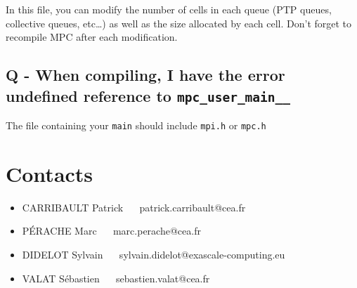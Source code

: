 \documentclass[a4paper,11pt]{article}
\begin{document}
In this file, you can modify the number of cells in each queue (PTP queues,
collective queues, etc\dots) as well as the size allocated by each cell. Don't
forget to recompile MPC after each modification.

\subsection*{Q - When compiling, I have the error undefined reference to \texttt{mpc\_user\_main\_\_}}
The file containing your \texttt{main} should include \texttt{mpi.h} or
\texttt{mpc.h}

\section{Contacts}
\begin{itemize}
  \item CARRIBAULT Patrick $\quad$ patrick.carribault@cea.fr
  \item P\'{E}RACHE Marc $\quad$ marc.perache@cea.fr
  \item DIDELOT Sylvain $\quad$ sylvain.didelot@exascale-computing.eu
  \item VALAT S\'{e}bastien $\quad$ sebastien.valat@cea.fr
\end{itemize}


\end{document}
